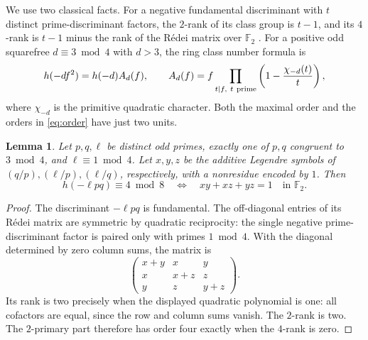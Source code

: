 \documentclass[11pt]{article}
\newtheorem{lemma}[theorem]{Lemma}
\begin{document}
We use two classical facts. For a negative fundamental discriminant
with $t$ distinct prime-discriminant factors, the $2$-rank of its
class group is $t-1$, and its $4$-rank is $t-1$ minus the rank of
the R\'edei matrix over $\mathbb F_2$ \cite[\S\S2--3]{stev}.
For a positive odd squarefree $d\equiv3\bmod4$ with $d>3$, the ring
class number formula \cite[Theorem~7.24]{cox} is
\begin{equation}\label{eq:order}
 h(-df^2)=h(-d) A_d(f),\qquad
 A_d(f)=f\prod_{t\mid f,\ t\ {\rm prime}}
 \left(1-\frac{\chi_{-d}(t)}{t}\right),
\end{equation}
where $\chi_{-d}$ is the primitive quadratic character. Both the
maximal order and the orders in \eqref{eq:order} have just two units.

\begin{lemma}\label{lem:redei}
Let $p,q,\ell$ be distinct odd primes, exactly one of $p,q$ congruent to
$3\bmod4$, and $\ell\equiv1\bmod4$. Let $x,y,z$ be the additive
Legendre symbols of $(q/p),(\ell/p),(\ell/q)$, respectively, with a
nonresidue encoded by $1$. Then
\[
               h(-\ell pq)\equiv4\bmod8
               \quad\Longleftrightarrow\quad xy+xz+yz=1
               \quad\text{in }\mathbb F_2.
\]
\end{lemma}
\begin{proof}
The discriminant $-\ell pq$ is fundamental. The off-diagonal entries
of its R\'edei matrix are symmetric by quadratic reciprocity: the
single negative prime-discriminant factor is paired only with primes
$1\bmod4$. With the diagonal determined by zero column sums, the matrix is
\[
 \begin{pmatrix}x+y&x&y\\x&x+z&z\\y&z&y+z\end{pmatrix}.
\]
Its rank is two precisely when the displayed quadratic polynomial is one:
all cofactors are equal, since the row and column sums vanish.
The $2$-rank is two. The $2$-primary part therefore has order four
exactly when the $4$-rank is zero.
\end{proof}
\end{document}
